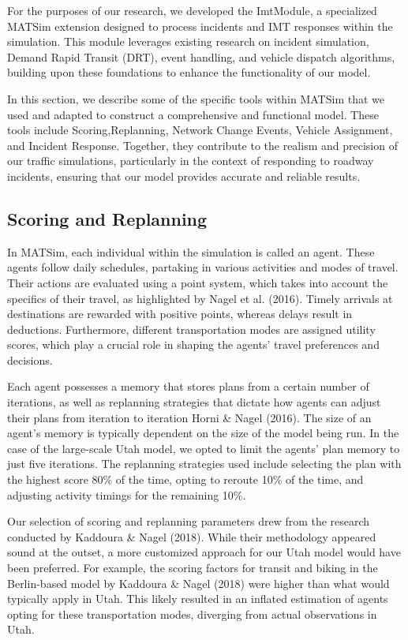 \documentclass[fancy, oneside, mastersfancy, ms]{byuthesis}
\begin{document}
For the purposes of our research, we developed the ImtModule, a
specialized MATSim extension designed to process incidents and IMT
responses within the simulation. This module leverages existing research
on incident simulation, Demand Rapid Transit (DRT), event handling, and
vehicle dispatch algorithms, building upon these foundations to enhance
the functionality of our model.

In this section, we describe some of the specific tools within MATSim
that we used and adapted to construct a comprehensive and functional
model. These tools include Scoring,Replanning, Network Change Events,
Vehicle Assignment, and Incident Response. Together, they contribute to
the realism and precision of our traffic simulations, particularly in
the context of responding to roadway incidents, ensuring that our model
provides accurate and reliable results.

\hypertarget{sec-MATSim_Score}{%
\subsection{Scoring and Replanning}\label{sec-MATSim_Score}}

In MATSim, each individual within the simulation is called an agent.
These agents follow daily schedules, partaking in various activities and
modes of travel. Their actions are evaluated using a point system, which
takes into account the specifics of their travel, as highlighted by
Nagel et al. (2016). Timely arrivals at destinations are rewarded with
positive points, whereas delays result in deductions. Furthermore,
different transportation modes are assigned utility scores, which play a
crucial role in shaping the agents' travel preferences and decisions.

Each agent possesses a memory that stores plans from a certain number of
iterations, as well as replanning strategies that dictate how agents can
adjust their plans from iteration to iteration Horni \& Nagel (2016).
The size of an agent's memory is typically dependent on the size of the
model being run. In the case of the large-scale Utah model, we opted to
limit the agents' plan memory to just five iterations. The replanning
strategies used include selecting the plan with the highest score 80\%
of the time, opting to reroute 10\% of the time, and adjusting activity
timings for the remaining 10\%.

Our selection of scoring and replanning parameters drew from the
research conducted by Kaddoura \& Nagel (2018). While their methodology
appeared sound at the outset, a more customized approach for our Utah
model would have been preferred. For example, the scoring factors for
transit and biking in the Berlin-based model by Kaddoura \& Nagel (2018)
were higher than what would typically apply in Utah. This likely
resulted in an inflated estimation of agents opting for these
transportation modes, diverging from actual observations in Utah.
\end{document}
